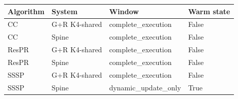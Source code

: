 \begin{tabular}{llll}
\toprule
Algorithm & System & Window & Warm state \\
\midrule
CC & G+R K4-shared & complete\_execution & False \\
CC & Spine & complete\_execution & False \\
ResPR & G+R K4-shared & complete\_execution & False \\
ResPR & Spine & complete\_execution & False \\
SSSP & G+R K4-shared & complete\_execution & False \\
SSSP & Spine & dynamic\_update\_only & True \\
\bottomrule
\end{tabular}
